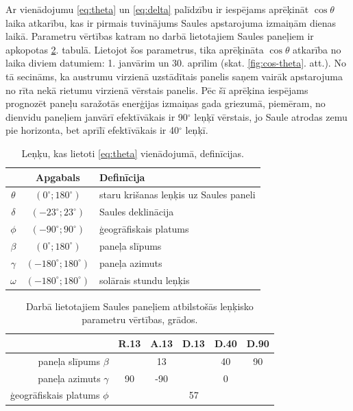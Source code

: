 Ar vienādojumu \ref{eq:theta} un \ref{eq:delta} palīdzību ir iespējams aprēķināt $\cos{\theta}$ laika atkarību, kas ir pirmais tuvinājums Saules apstarojuma izmaiņām dienas laikā.
Parametru vērtības katram no darbā lietotajiem Saules paneļiem ir apkopotas \ref{tab:param}. tabulā.
Lietojot šos parametrus, tika aprēķināta $\cos{\theta}$ atkarība no laika diviem datumiem: 1. janvārim un 30. aprīlim (skat. \ref{fig:cos-theta}. att.). No tā secināms, ka austrumu virzienā uzstādītais panelis saņem vairāk apstarojuma no rīta nekā rietumu virzienā vērstais panelis. Pēc šī aprēķina iespējams prognozēt paneļu saražotās enerģijas izmaiņas gada griezumā, piemēram, no dienvidu paneļiem janvārī efektīvākais ir 90$^\circ$ leņķī vērstais, jo Saule atrodas zemu pie horizonta, bet aprīlī efektīvākais ir 40$^\circ$ leņķī.

\begin{table}[h!]
\caption{Leņķu, kas lietoti \ref{eq:theta} vienādojumā, definīcijas.}
\begin{center}
\begin{tabular}{|c|c|l|}\hline
	         &         Apgabals         & Definīcija\\ \hline
	$\theta$ &  $(0^\circ;180^\circ)$   & staru krišanas leņķis uz Saules paneli\\ \hline
	$\delta$ &  $(-23^\circ;23^\circ)$  & Saules deklinācija\\ \hline
	 $\phi$  &  $(-90^\circ;90^\circ)$  & ģeogrāfiskais platums\\ \hline
	$\beta$  &  $(0^\circ;180^\circ)$   & paneļa slīpums \\ \hline
	$\gamma$ & $(-180^\circ;180^\circ)$ & paneļa azimuts \\ \hline
	$\omega$ & $(-180^\circ;180^\circ)$ & solārais stundu leņķis\\ \hline
\end{tabular}
\end{center}
\label{tab:theta}
\end{table}

\begin{table}[h!]
	\caption{Darbā lietotajiem Saules paneļiem atbilstošās leņķisko parametru vērtības, grādos.}
	\begin{center}
		\begin{tabular}{|r|c|c|c|c|c|}
			\hline
			         & R.13 & A.13 &   D.13   & D.40 & D.90 \\ \hline
			paneļa slīpums $\beta$  & \multicolumn{3}{c|}{13} &  40  &  90  \\ \hline
			paneļa azimuts $\gamma$ &  90  & -90  & \multicolumn{3}{c|}{0}  \\ \hline
			ģeogrāfiskais platums $\phi$  &        \multicolumn{5}{c|}{57}        \\ \hline
		\end{tabular}
	\end{center}
	\label{tab:param}
\end{table}

